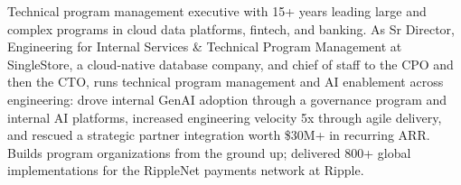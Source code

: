\documentclass[11pt,letterpaper,sans]{moderncv}
\begin{document}
\makecvtitle


\vspace{6pt}
\small{Technical program management executive with 15+ years leading large and complex programs in cloud data platforms, fintech, and banking. As Sr Director, Engineering for Internal Services \& Technical Program Management at SingleStore, a cloud-native database company, and chief of staff to the CPO and then the CTO, runs technical program management and AI enablement across engineering: drove internal GenAI adoption through a governance program and internal AI platforms, increased engineering velocity 5x through agile delivery, and rescued a strategic partner integration worth \$30M+ in recurring ARR. Builds program organizations from the ground up; delivered 800+ global implementations for the RippleNet payments network at Ripple.}

\end{document}
